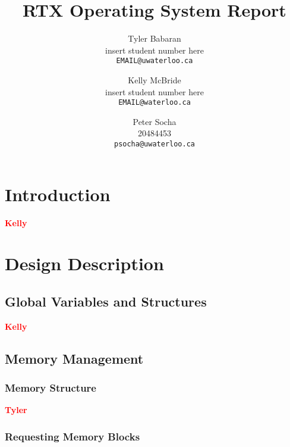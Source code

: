 \documentclass[12pt]{report}
\begin{document}
\title{RTX Operating System Report}

\author{
    Tyler Babaran\\
		insert student number here\\
    \texttt{EMAIL@uwaterloo.ca}
    \and
    Kelly McBride\\
		insert student number here\\
    \texttt{EMAIL@waterloo.ca}
    \and
    Peter Socha\\
		20484453\\
    \texttt{psocha@uwaterloo.ca}
}

\maketitle


\tableofcontents
\listofalgorithms
\listoffigures

\chapter{Introduction}

\textcolor{red}{\textbf{Kelly}} \\

\chapter{Design Description}

\section{Global Variables and Structures}

\textcolor{red}{\textbf{Kelly}} \\

\section{Memory Management}

\subsection{Memory Structure}

\textcolor{red}{\textbf{Tyler}} \\

\subsection{Requesting Memory Blocks}
\end{document}

